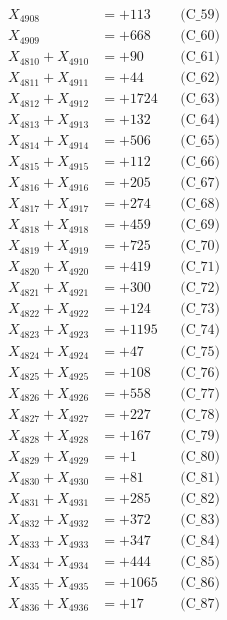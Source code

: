 \documentclass[a4paper,10pt]{article}
\begin{document}
{\begin{align}
X_{4908} &= +113 && \text{(C\_59)} \\
X_{4909} &= +668 && \text{(C\_60)} \\
\allowbreak
X_{4810} + X_{4910} &= +90 && \text{(C\_61)} \\
X_{4811} + X_{4911} &= +44 && \text{(C\_62)} \\
X_{4812} + X_{4912} &= +1724 && \text{(C\_63)} \\
X_{4813} + X_{4913} &= +132 && \text{(C\_64)} \\
X_{4814} + X_{4914} &= +506 && \text{(C\_65)} \\
\allowbreak
X_{4815} + X_{4915} &= +112 && \text{(C\_66)} \\
X_{4816} + X_{4916} &= +205 && \text{(C\_67)} \\
X_{4817} + X_{4917} &= +274 && \text{(C\_68)} \\
X_{4818} + X_{4918} &= +459 && \text{(C\_69)} \\
X_{4819} + X_{4919} &= +725 && \text{(C\_70)} \\
\allowbreak
X_{4820} + X_{4920} &= +419 && \text{(C\_71)} \\
X_{4821} + X_{4921} &= +300 && \text{(C\_72)} \\
X_{4822} + X_{4922} &= +124 && \text{(C\_73)} \\
X_{4823} + X_{4923} &= +1195 && \text{(C\_74)} \\
X_{4824} + X_{4924} &= +47 && \text{(C\_75)} \\
\allowbreak
X_{4825} + X_{4925} &= +108 && \text{(C\_76)} \\
X_{4826} + X_{4926} &= +558 && \text{(C\_77)} \\
X_{4827} + X_{4927} &= +227 && \text{(C\_78)} \\
X_{4828} + X_{4928} &= +167 && \text{(C\_79)} \\
X_{4829} + X_{4929} &= +1 && \text{(C\_80)} \\
\allowbreak
X_{4830} + X_{4930} &= +81 && \text{(C\_81)} \\
X_{4831} + X_{4931} &= +285 && \text{(C\_82)} \\
X_{4832} + X_{4932} &= +372 && \text{(C\_83)} \\
X_{4833} + X_{4933} &= +347 && \text{(C\_84)} \\
X_{4834} + X_{4934} &= +444 && \text{(C\_85)} \\
\allowbreak
X_{4835} + X_{4935} &= +1065 && \text{(C\_86)} \\
X_{4836} + X_{4936} &= +17 && \text{(C\_87)} \\

\end{align}}
\end{document}
